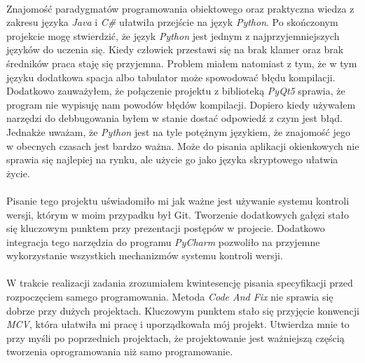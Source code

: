 \documentclass[a4paper]{article}
\begin{document}
\paragraph{}
Znajomość paradygmatów programowania obiektowego oraz praktyczna wiedza z zakresu języka \textit{Java} i \textit{C\#} ułatwiła przejście na język \textit{Python}. Po skończonym projekcie mogę stwierdzić, że język \textit{Python} jest jednym z najprzyjemniejszych języków do uczenia się. Kiedy człowiek przestawi się na brak klamer oraz brak średników praca staję się przyjemna. Problem miałem natomiast z tym, że w tym języku dodatkowa spacja albo tabulator może spowodować błędu kompilacji. Dodatkowo zauważyłem, że połączenie projektu z biblioteką \textit{PyQt5} sprawia, że program nie wypisuję nam powodów błędów kompilacji. Dopiero kiedy używałem narzędzi do debbugowania byłem w stanie dostać odpowiedź z czym jest błąd.\\
Jednakże uważam, że \textit{Python} jest na tyle potężnym językiem, że znajomość jego w obecnych czasach jest bardzo ważna. Może do pisania aplikacji okienkowych nie sprawia się najlepiej na rynku, ale użycie go jako języka skryptowego ułatwia życie.
\paragraph{}
Pisanie tego projektu uświadomiło mi jak ważne jest używanie systemu kontroli wersji, którym w moim przypadku był Git. Tworzenie dodatkowych gałęzi stało się kluczowym punktem przy prezentacji postępów w projecie. Dodatkowo integracja tego narzędzia do programu \textit{PyCharm} pozwoliło na przyjemne wykorzystanie wszystkich mechanizmów systemu kontroli wersji.
\paragraph{}
W trakcie realizacji zadania zrozumiałem kwintesencję pisania specyfikacji przed rozpoczęciem samego programowania. Metoda \textit{Code And Fix} nie sprawia się dobrze przy dużych projektach. Kluczowym punktem stało się przyjęcie konwencji \textit{MCV}, która ułatwiła mi pracę i uporządkowała mój projekt. Utwierdza mnie to przy myśli po poprzednich projektach, że projektowanie jest ważniejszą częścią tworzenia oprogramowania niż samo programowanie.
\label{end}
\end{document}

